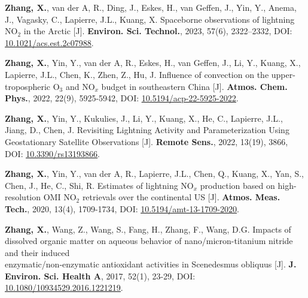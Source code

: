 \begin{enumerate}[label={[\arabic*]}, leftmargin=20pt, widest=0, itemindent=*, topsep=0pt, partopsep=0pt, parsep=0pt]

\item \textbf{Zhang, X.}, van der A, R., Ding, J., Eskes, H., van Geffen, J., Yin, Y., Anema, J.,
Vagasky, C., Lapierre, J.L., Kuang, X. Spaceborne observations of lightning NO$_2$ in the Arctic [J].
\textbf{Environ. Sci. Technol.}, 2023, 57(6), 2322--2332,
DOI: \underline{\href{https://doi.org/10.1021/acs.est.2c07988}{10.1021/acs.est.2c07988}}.

\item \textbf{Zhang, X.}, Yin, Y., van der A, R., Eskes, H., van Geffen, J., Li, Y., Kuang, X., Lapierre,
J.L., Chen, K., Zhen, Z., Hu, J. Influence of convection on the
upper-tropospheric O$_3$ and NO$_x$ budget in southeastern China [J].
\textbf{Atmos. Chem. Phys.}, 2022, 22(9), 5925-5942,
DOI: \underline{\href{https://doi.org/10.5194/acp-22-5925-2022}{10.5194/acp-22-5925-2022}}.

\item \textbf{Zhang, X.}, Yin, Y., Kukulies, J., Li, Y., Kuang, X., He, C., Lapierre, J.L., Jiang, D., Chen,
J. Revisiting Lightning Activity and Parameterization Using Geostationary
Satellite Observations [J].
\textbf{Remote Sens.}, 2022, 13(19), 3866,
DOI: \underline{\href{https://doi.org/10.3390/rs13193866}{10.3390/rs13193866}}.

\item \textbf{Zhang, X.}, Yin, Y., van der A, R., Lapierre, J.L., Chen, Q., Kuang, X., Yan, S., Chen, J.,
He, C., Shi, R. Estimates of lightning NO$_x$ production based on high-resolution
OMI NO$_2$ retrievals over the continental US [J].
\textbf{Atmos. Meas. Tech.}, 2020, 13(4), 1709-1734,
DOI: \underline{\href{https://doi.org/10.5194/amt-13-1709-2020}{10.5194/amt-13-1709-2020}}.

\item \textbf{Zhang, X.}, Wang, Z., Wang, S., Fang, H., Zhang, F., Wang, D.G.
Impacts of dissolved organic matter on aqueous behavior of nano/micron-titanium nitride and their induced \\
enzymatic/non-enzymatic antioxidant activities in Scenedesmus obliquus [J].
\textbf{J. Environ. Sci. Health A}, 2017, 52(1), 23-29,
DOI: \underline{\href{https://doi.org/10.1080/10934529.2016.1221219}{10.1080/10934529.2016.1221219}}.

\end{enumerate}

